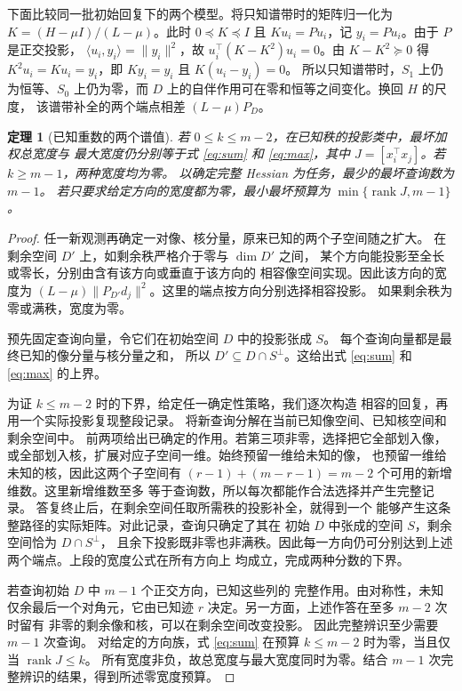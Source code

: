 \documentclass[UTF8,11pt,fontset=windows]{ctexart}
\newtheorem{theorem}{定理}
\newcommand{\rank}{\operatorname{rank}}
\begin{document}
下面比较同一批初始回复下的两个模型。将只知谱带时的矩阵归一化为 \(K=(H-\mu I)/(L-\mu)\)。此时 \(0\preceq K\preceq I\)
且 \(Ku_i=Pu_i\)，记 \(y_i=Pu_i\)。由于 \(P\) 是正交投影，
\(\langle u_i,y_i\rangle=\|y_i\|^2\)，故
\(u_i^\top(K-K^2)u_i=0\)。由 \(K-K^2\succeq0\) 得
\(K^2u_i=Ku_i=y_i\)，即 \(Ky_i=y_i\) 且 \(K(u_i-y_i)=0\)。
所以只知谱带时，\(S_1\) 上仍为恒等、\(S_0\) 上仍为零，而 \(D\)
上的自伴作用可在零和恒等之间变化。换回 \(H\) 的尺度，
该谱带补全的两个端点相差 \((L-\mu)P_D\)。

\begin{theorem}[已知重数的两个谱值]\label{thm:projector}
若 \(0\le k\le m-2\)，在已知秩的投影类中，最坏加权总宽度与
最大宽度仍分别等于式 \eqref{eq:sum} 和 \eqref{eq:max}，其中
\(J=[x_i^\top x_j]\)。若 \(k\ge m-1\)，两种宽度均为零。
以确定完整 Hessian 为任务，最少的最坏查询数为 \(m-1\)。
若只要求给定方向的宽度都为零，最小最坏预算为 \(\min\{\rank J,m-1\}\)。
\end{theorem}

\begin{proof}
任一新观测再确定一对像、核分量，原来已知的两个子空间随之扩大。
在剩余空间 \(D'\) 上，如剩余秩严格介于零与 \(\dim D'\) 之间，
某个方向能投影至全长或零长，分别由含有该方向或垂直于该方向的
相容像空间实现。因此该方向的宽度为
\((L-\mu)\|P_{D'}d_j\|^2\)。这里的端点按方向分别选择相容投影。
如果剩余秩为零或满秩，宽度为零。

预先固定查询向量，令它们在初始空间 \(D\) 中的投影张成 \(S\)。
每个查询向量都是最终已知的像分量与核分量之和，
所以 \(D'\subseteq D\cap S^\perp\)。这给出式 \eqref{eq:sum} 和
\eqref{eq:max} 的上界。

为证 \(k\le m-2\) 时的下界，给定任一确定性策略，我们逐次构造
相容的回复，再用一个实际投影复现整段记录。
将新查询分解在当前已知像空间、已知核空间和剩余空间中。
前两项给出已确定的作用。若第三项非零，选择把它全部划入像，
或全部划入核，扩展对应子空间一维。始终预留一维给未知的像，
也预留一维给未知的核，因此这两个子空间有
\((r-1)+(m-r-1)=m-2\) 个可用的新增维数。这里新增维数至多
等于查询数，所以每次都能作合法选择并产生完整记录。
答复终止后，在剩余空间任取所需秩的投影补全，就得到一个
能够产生这条整路径的实际矩阵。对此记录，查询只确定了其在
初始 \(D\) 中张成的空间 \(S\)，剩余空间恰为 \(D\cap S^\perp\)，
且余下投影既非零也非满秩。因此每一方向仍可分别达到上述两个端点。上段的宽度公式在所有方向上
均成立，完成两种分数的下界。

若查询初始 \(D\) 中 \(m-1\) 个正交方向，已知这些列的
完整作用。由对称性，未知仅余最后一个对角元，它由已知迹
\(r\) 决定。另一方面，上述作答在至多 \(m-2\) 次时留有
非零的剩余像和核，可以在剩余空间改变投影。
因此完整辨识至少需要 \(m-1\) 次查询。
对给定的方向族，式 \eqref{eq:sum} 在预算
\(k\le m-2\) 时为零，当且仅当 \(\rank J\le k\)。
所有宽度非负，故总宽度与最大宽度同时为零。结合 \(m-1\)
次完整辨识的结果，得到所述零宽度预算。
\end{proof}
\end{document}
